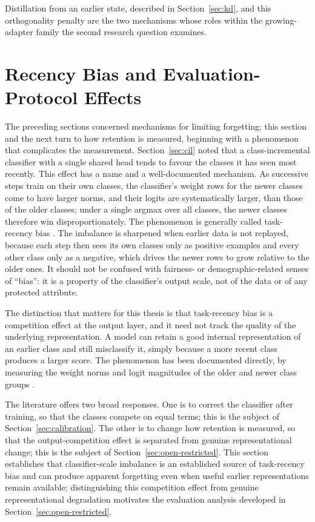 Distillation from an earlier state, described in Section~\ref{sec:kd}, and this
orthogonality penalty are the two mechanisms whose roles within the
growing-adapter family the second research question examines.

\section{Recency Bias and Evaluation-Protocol Effects}
\label{sec:recency-bias}

The preceding sections concerned mechanisms for limiting forgetting; this
section and the next turn to how retention is measured, beginning with a
phenomenon that complicates the measurement. Section~\ref{sec:cil} noted that a
class-incremental classifier with a single shared head tends to favour the
classes it has seen most recently. This effect has
a name and a well-documented mechanism. As successive steps train on their
own classes, the classifier's weight rows for the newer classes come to
have larger norms, and their logits are systematically larger, than those
of the older classes; under a single argmax over all classes, the newer
classes therefore win disproportionately. The phenomenon is generally
called task-recency bias \parencite{masana2020classincremental,liang2023new}. The
imbalance is sharpened when earlier data is not replayed, because each step
then sees its own classes only as positive examples and every other class
only as a negative, which drives the newer rows to grow relative to the
older ones. It should not be confused with fairness- or demographic-related
senses of \enquote{bias}: it is a property of the classifier's output scale, not of
the data or of any protected attribute.

The distinction that matters for this thesis is that task-recency bias is a
competition effect at the output layer, and it need not track the quality
of the underlying representation. A model can retain a good internal
representation of an earlier class and still misclassify it, simply because
a more recent class produces a larger score. The phenomenon has been
documented directly, by measuring the weight norms and logit magnitudes of
the older and newer class groups \parencite{liang2023new}.

The literature offers two broad responses. One is to correct the classifier
after training, so that the classes compete on equal terms; this is the
subject of Section~\ref{sec:calibration}. The other is to change how retention is measured,
so that the output-competition effect is separated from genuine
representational change; this is the subject of Section~\ref{sec:open-restricted}. This section
establishes that classifier-scale imbalance is an established source of
task-recency bias and can produce apparent forgetting even when useful
earlier representations remain available; distinguishing this competition
effect from genuine representational degradation motivates the evaluation
analysis developed in Section~\ref{sec:open-restricted}.

